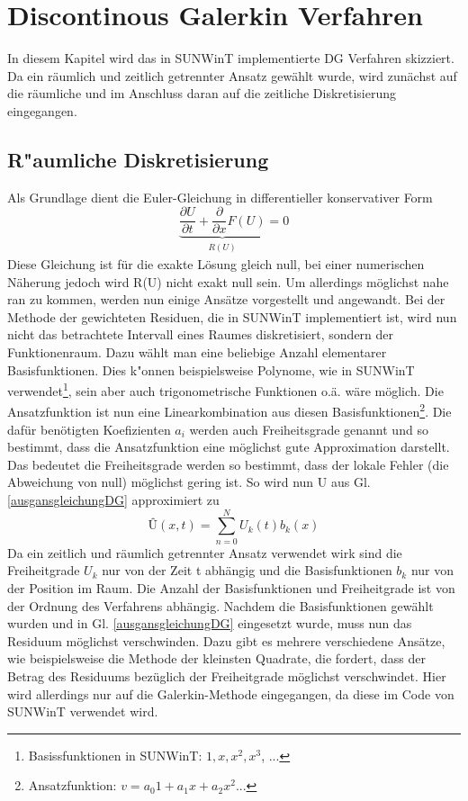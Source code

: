 \newpage
\chapter{Discontinous Galerkin Verfahren}
In diesem Kapitel wird das in SUNWinT implementierte DG Verfahren skizziert. Da ein räumlich und zeitlich getrennter Ansatz gewählt wurde, wird zunächst auf die räumliche und im Anschluss daran auf die zeitliche Diskretisierung eingegangen.

\section{R"aumliche Diskretisierung}
Als Grundlage dient die Euler-Gleichung in differentieller konservativer Form
\begin{equation}\label{ausgansgleichungDG}
	\underbrace{\frac{\partial U}{\partial t}+ \frac{\partial}{\partial x} F(U)}_{\substack{R(U)}} = 0
\end{equation}
Diese Gleichung ist für die exakte Lösung gleich null, bei einer numerischen Näherung jedoch wird R(U) nicht exakt null sein. Um allerdings möglichst nahe ran zu kommen, werden nun einige Ansätze vorgestellt und angewandt.
Bei der Methode der gewichteten Residuen, die in SUNWinT implementiert ist, wird nun nicht das betrachtete Intervall eines Raumes diskretisiert, sondern der Funktionenraum. Dazu wählt man eine beliebige Anzahl elementarer Basisfunktionen. Dies k"onnen beispielsweise Polynome, wie in SUNWinT verwendet\footnote{Basissfunktionen in SUNWinT: $1, x, x^2, x^3$, ...}, sein aber auch trigonometrische Funktionen o.ä. wäre möglich. Die Ansatzfunktion ist nun eine Linearkombination aus diesen Basisfunktionen\footnote{Ansatzfunktion: $v = a_{0}1+a_{1}x+a_{2}x^2$...}. Die dafür benötigten Koefizienten $a_{i}$ werden auch Freiheitsgrade genannt und so bestimmt, dass die Ansatzfunktion eine möglichst gute Approximation darstellt. Das bedeutet die Freiheitsgrade werden so bestimmt, dass der lokale Fehler (die Abweichung von null) möglichst gering ist.
So wird nun U aus Gl. \ref{ausgansgleichungDG} approximiert zu 
\begin{equation}\label{Uansatz}
	\text{\^{U}}(x, t) = \sum_{n=0}^N U_{k}(t)b_{k}(x)
\end{equation}
Da ein zeitlich und räumlich getrennter Ansatz verwendet wirk sind die Freiheitgrade $U_{k}$ nur von der Zeit t abhängig und die Basisfunktionen $b_{k}$ nur von der Position im Raum. Die Anzahl der Basisfunktionen und Freiheitgrade ist von der Ordnung des Verfahrens abhängig.
Nachdem die Basisfunktionen gewählt wurden und in Gl. \ref{ausgansgleichungDG} eingesetzt wurde, muss nun das Residuum möglichst verschwinden. Dazu gibt es mehrere verschiedene Ansätze, wie beispielsweise die Methode der kleinsten Quadrate, die fordert, dass der Betrag des Residuums bezüglich der Freiheitgrade möglichst verschwindet. Hier wird allerdings nur auf die Galerkin-Methode eingegangen, da diese im Code von SUNWinT verwendet wird.
